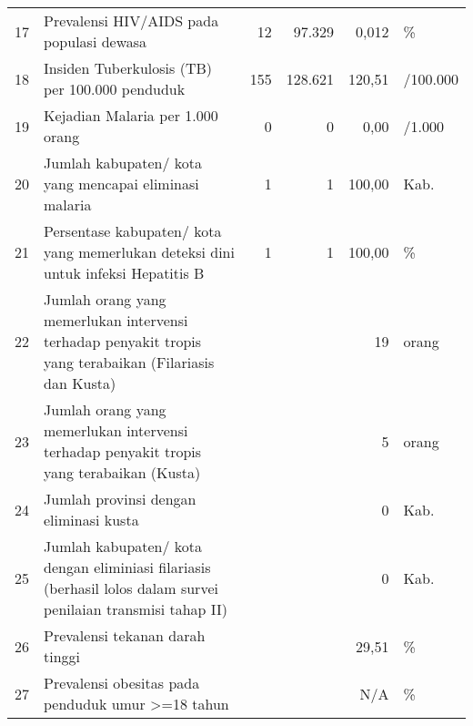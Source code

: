 \begin{center}
\begin{longtable}{rY{12em}rrrY{6em}}
                   17 & Prevalensi HIV/AIDS pada populasi dewasa                                                                                       &      12 &  97.329 &    0,012 & \%                  \\
                   18 & Insiden Tuberkulosis (TB) per 100.000 penduduk                                                                                 &     155 & 128.621 &   120,51 & /100.000            \\
                   19 & Kejadian Malaria per 1.000 orang                                                                                               &       0 &       0 &     0,00 & /1.000              \\
                   20 & Jumlah kabupaten/ kota yang mencapai eliminasi malaria                                                                         &       1 &       1 &   100,00 & Kab.                \\
                   21 & Persentase kabupaten/ kota yang memerlukan deteksi dini untuk infeksi Hepatitis B                                              &       1 &       1 &   100,00 & \%                  \\
                   22 & Jumlah orang yang memerlukan intervensi terhadap penyakit tropis yang terabaikan (Filariasis dan Kusta)                        &         &         &       19 & orang               \\
                   23 & Jumlah orang yang memerlukan intervensi terhadap penyakit tropis yang terabaikan (Kusta)                                       &         &         &        5 & orang               \\
                   24 & Jumlah provinsi dengan eliminasi kusta                                                                                         &         &         &        0 & Kab.                \\
                   25 & Jumlah kabupaten/ kota dengan eliminiasi filariasis (berhasil lolos dalam survei penilaian transmisi tahap II)                 &         &         &        0 & Kab.                \\
                   26 & Prevalensi tekanan darah tinggi                                                                                                &         &         &    29,51 & \%                  \\
                   27 & Prevalensi obesitas pada penduduk umur >=18 tahun                                                                              &         &         &      N/A & \%                  \\

\end{longtable}
\end{center}

